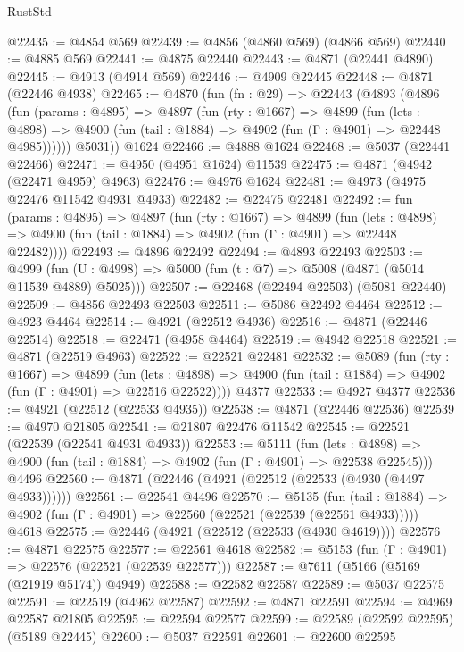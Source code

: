\begin{lexlean}{RustStd}
\begin{coremodule}
@22435 := @4854 @569
@22439 := @4856 (@4860 @569) (@4866 @569)
@22440 := @4885 @569
@22441 := @4875 @22440
@22443 := @4871 (@22441 @4890)
@22445 := @4913 (@4914 @569)
@22446 := @4909 @22445
@22448 := @4871 (@22446 @4938)
@22465 := @4870
    (fun (fn : @29) =>
    @22443
      (@4893
        (@4896
          (fun (params : @4895) =>
          @4897
            (fun (rty : @1667) =>
            @4899
              (fun (lets : @4898) =>
              @4900 (fun (tail : @1884) => @4902 (fun (Γ : @4901) => @22448 @4985))))))
        @5031))
    @1624
@22466 := @4888 @1624
@22468 := @5037 (@22441 @22466)
@22471 := @4950 (@4951 @1624) @11539
@22475 := @4871 (@4942 (@22471 @4959) @4963)
@22476 := @4976 @1624
@22481 := @4973 (@4975 @22476 @11542 @4931 @4933)
@22482 := @22475 @22481
@22492 := fun (params : @4895) =>
  @4897
    (fun (rty : @1667) =>
    @4899
      (fun (lets : @4898) =>
      @4900 (fun (tail : @1884) => @4902 (fun (Γ : @4901) => @22448 @22482))))
@22493 := @4896 @22492
@22494 := @4893 @22493
@22503 := @4999
    (fun (U : @4998) => @5000 (fun (t : @7) => @5008 (@4871 (@5014 @11539 @4889) @5025)))
@22507 := @22468 (@22494 @22503) (@5081 @22440)
@22509 := @4856 @22493 @22503
@22511 := @5086 @22492 @4464
@22512 := @4923 @4464
@22514 := @4921 (@22512 @4936)
@22516 := @4871 (@22446 @22514)
@22518 := @22471 (@4958 @4464)
@22519 := @4942 @22518
@22521 := @4871 (@22519 @4963)
@22522 := @22521 @22481
@22532 := @5089
    (fun (rty : @1667) =>
    @4899
      (fun (lets : @4898) =>
      @4900 (fun (tail : @1884) => @4902 (fun (Γ : @4901) => @22516 @22522))))
    @4377
@22533 := @4927 @4377
@22536 := @4921 (@22512 (@22533 @4935))
@22538 := @4871 (@22446 @22536)
@22539 := @4970 @21805
@22541 := @21807 @22476 @11542
@22545 := @22521 (@22539 (@22541 @4931 @4933))
@22553 := @5111
    (fun (lets : @4898) => @4900 (fun (tail : @1884) => @4902 (fun (Γ : @4901) => @22538 @22545)))
    @4496
@22560 := @4871 (@22446 (@4921 (@22512 (@22533 (@4930 (@4497 @4933))))))
@22561 := @22541 @4496
@22570 := @5135
    (fun (tail : @1884) => @4902 (fun (Γ : @4901) => @22560 (@22521 (@22539 (@22561 @4933)))))
    @4618
@22575 := @22446 (@4921 (@22512 (@22533 (@4930 @4619))))
@22576 := @4871 @22575
@22577 := @22561 @4618
@22582 := @5153 (fun (Γ : @4901) => @22576 (@22521 (@22539 @22577)))
@22587 := @7611 (@5166 (@5169 (@21919 @5174)) @4949)
@22588 := @22582 @22587
@22589 := @5037 @22575
@22591 := @22519 (@4962 @22587)
@22592 := @4871 @22591
@22594 := @4969 @22587 @21805
@22595 := @22594 @22577
@22599 := @22589 (@22592 @22595) (@5189 @22445)
@22600 := @5037 @22591
@22601 := @22600 @22595

\end{coremodule}
\end{lexlean}
